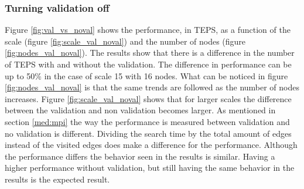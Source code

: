 \subsubsection{Turning validation off}
\label{sec:noval}
 Figure \ref{fig:val_vs_noval} shows the performance, in TEPS, as a function of the scale (figure \ref{fig:scale_val_noval}) and the number of nodes (figure \ref{fig:nodes_val_noval}). The results show that there is a difference in the number of TEPS with and without the validation. The difference in performance can be up to 50\% in the case of scale 15 with 16 nodes. What can be noticed in figure \ref{fig:nodes_val_noval} is that the same trends are followed as the number of nodes increases.
 Figure \ref{fig:scale_val_noval} shows that for larger scales the difference between the validation and non validation becomes larger. As mentioned in section \ref{med:mpi} the way the performance is measured between validation and no validation is different. Dividing the search time by the total amount of edges instead of the visited edges does make a difference for the performance. Although the performance differs the behavior seen in the results is similar. Having a higher performance without validation, but still having the same behavior in the results is the expected result. 

